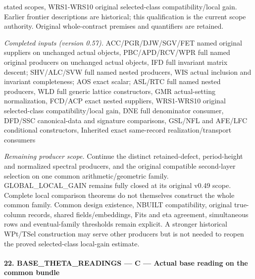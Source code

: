 stated scopes, WRS1-WRS10 original selected-class compatibility/local gain. Earlier frontier descriptions are historical; this qualification is the current scope authority. Original whole-contract premises and quantifiers are retained.

\emph{Completed inputs (version 0.57).} ACC/PGR/DJW/SGV/FET named original suppliers on unchanged actual objects, PBC/APD/RCV/WPR full named original producers on unchanged actual objects, IFD full invariant matrix descent; SHV/ALC/SVW full named nested producers, WIS actual inclusion and invariant completeness; AOS exact scalar; ASL/RTC full named nested producers, WLD full generic lattice constructors, GMR actual-setting normalization, FCD/ACP exact nested suppliers, WRS1-WRS10 original selected-class compatibility/local gain, DNE full denominator consumer, DFD/SSC canonical-data and signature comparisons, GSL/NFL and AFE/LFC conditional constructors, Inherited exact same-record realization/transport consumers

\emph{Remaining producer scope.} Continue the distinct retained-defect, period-height and normalized spectral producers, and the original compatible second-layer selection on one common arithmetic/geometric family. GLOBAL\_\allowbreak LOCAL\_\allowbreak GAIN remains fully closed at its original v0.49 scope. Complete local comparison theorems do not themselves construct the whole common family. Common design existence, NBUILT compatibility, original true-column records, shared fields/embeddings, Fits and eta agreement, simultaneous rows and eventual-family thresholds remain explicit. A stronger historical WPt/TSel construction may serve other producers but is not needed to reopen the proved selected-class local-gain estimate.



\paragraph{22. BASE\_\allowbreak THETA\_\allowbreak READINGS — C — Actual base reading on the common bundle}

